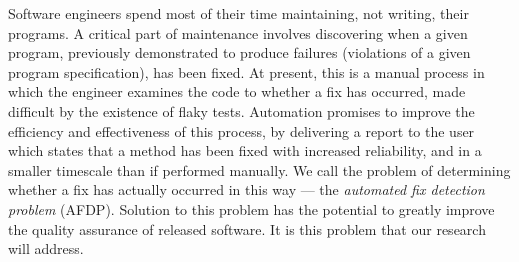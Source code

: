 
Software engineers spend most of their time maintaining, not writing, their programs. A critical part of maintenance involves discovering when a given program, previously demonstrated to produce failures (violations of a given program specification), has been fixed. 
At present, this is a manual process in which the engineer examines the code to whether a fix has occurred, made difficult by the existence of flaky tests. Automation promises to improve the efficiency and effectiveness of this process, by delivering a report to the user which states that a method has been fixed with increased reliability, and in a smaller timescale than if performed manually. We call the problem of determining whether a fix has actually occurred in this way --- the \textit{automated fix detection problem} (AFDP). Solution to this problem has the potential to greatly improve the quality assurance of released software. It is this problem that our research will address. 
